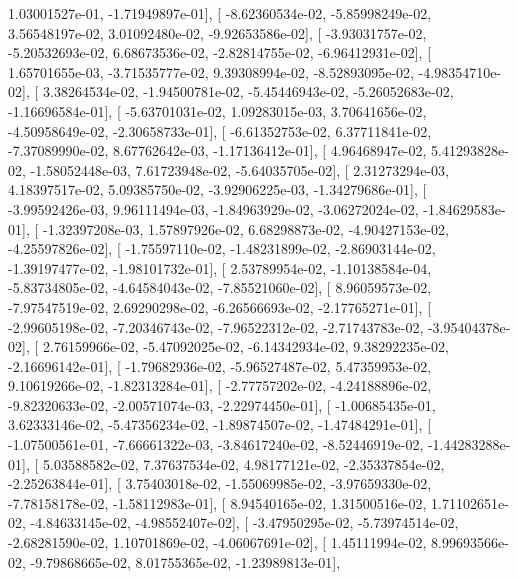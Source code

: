 \documentclass{article}
\begin{document}
          1.03001527e-01,  -1.71949897e-01],
       [ -8.62360534e-02,  -5.85998249e-02,   3.56548197e-02,
          3.01092480e-02,  -9.92653586e-02],
       [ -3.93031757e-02,  -5.20532693e-02,   6.68673536e-02,
         -2.82814755e-02,  -6.96412931e-02],
       [  1.65701655e-03,  -3.71535777e-02,   9.39308994e-02,
         -8.52893095e-02,  -4.98354710e-02],
       [  3.38264534e-02,  -1.94500781e-02,  -5.45446943e-02,
         -5.26052683e-02,  -1.16696584e-01],
       [ -5.63701031e-02,   1.09283015e-03,   3.70641656e-02,
         -4.50958649e-02,  -2.30658733e-01],
       [ -6.61352753e-02,   6.37711841e-02,  -7.37089990e-02,
          8.67762642e-03,  -1.17136412e-01],
       [  4.96468947e-02,   5.41293828e-02,  -1.58052448e-03,
          7.61723948e-02,  -5.64035705e-02],
       [  2.31273294e-03,   4.18397517e-02,   5.09385750e-02,
         -3.92906225e-03,  -1.34279686e-01],
       [ -3.99592426e-03,   9.96111494e-03,  -1.84963929e-02,
         -3.06272024e-02,  -1.84629583e-01],
       [ -1.32397208e-03,   1.57897926e-02,   6.68298873e-02,
         -4.90427153e-02,  -4.25597826e-02],
       [ -1.75597110e-02,  -1.48231899e-02,  -2.86903144e-02,
         -1.39197477e-02,  -1.98101732e-01],
       [  2.53789954e-02,  -1.10138584e-04,  -5.83734805e-02,
         -4.64584043e-02,  -7.85521060e-02],
       [  8.96059573e-02,  -7.97547519e-02,   2.69290298e-02,
         -6.26566693e-02,  -2.17765271e-01],
       [ -2.99605198e-02,  -7.20346743e-02,  -7.96522312e-02,
         -2.71743783e-02,  -3.95404378e-02],
       [  2.76159966e-02,  -5.47092025e-02,  -6.14342934e-02,
          9.38292235e-02,  -2.16696142e-01],
       [ -1.79682936e-02,  -5.96527487e-02,   5.47359953e-02,
          9.10619266e-02,  -1.82313284e-01],
       [ -2.77757202e-02,  -4.24188896e-02,  -9.82320633e-02,
         -2.00571074e-03,  -2.22974450e-01],
       [ -1.00685435e-01,   3.62333146e-02,  -5.47356234e-02,
         -1.89874507e-02,  -1.47484291e-01],
       [ -1.07500561e-01,  -7.66661322e-03,  -3.84617240e-02,
         -8.52446919e-02,  -1.44283288e-01],
       [  5.03588582e-02,   7.37637534e-02,   4.98177121e-02,
         -2.35337854e-02,  -2.25263844e-01],
       [  3.75403018e-02,  -1.55069985e-02,  -3.97659330e-02,
         -7.78158178e-02,  -1.58112983e-01],
       [  8.94540165e-02,   1.31500516e-02,   1.71102651e-02,
         -4.84633145e-02,  -4.98552407e-02],
       [ -3.47950295e-02,  -5.73974514e-02,  -2.68281590e-02,
          1.10701869e-02,  -4.06067691e-02],
       [  1.45111994e-02,   8.99693566e-02,  -9.79868665e-02,
          8.01755365e-02,  -1.23989813e-01],
\end{document}
